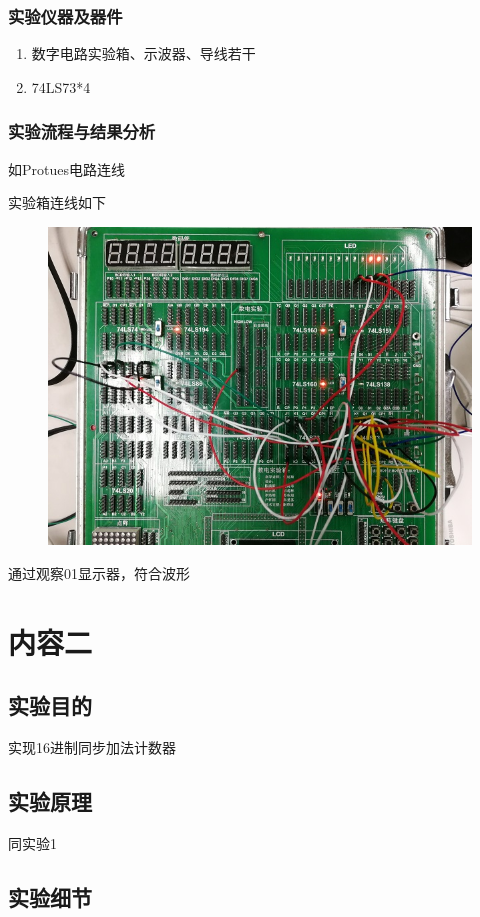 \documentclass[11pt,UTF8]{ctexart}
\begin{document}
\subsubsection{实验仪器及器件}
\begin{enumerate}
    \item 数字电路实验箱、示波器、导线若干
    \item 74LS73*4
\end{enumerate}

\subsubsection{实验流程与结果分析}
\par 如Protues电路连线
\par 实验箱连线如下
\begin{figure}[H]
    \centering
    \includegraphics[width=0.6\linewidth]{fig/adder_1.jpg}
\end{figure}
\par 通过观察01显示器，符合波形


\section{内容二}
\subsection{实验目的}
实现16进制同步加法计数器

\subsection{实验原理}
\par 同实验1

\subsection{实验细节}
\end{document}

